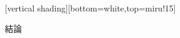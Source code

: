 \documentclass[14pt,dvipdfmx,uplatex]{beamer}
\begin{document}


[vertical shading][bottom=white,top=miru!15]

\begin{frame}[plain]
  \begin{center}
    \color{miru}\yasagoth
    結論
  \end{center}
\end{frame}




\end{document}
